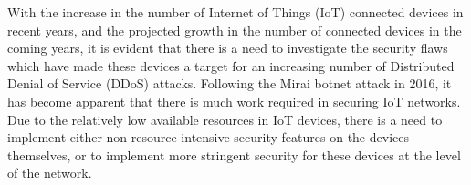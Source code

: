 With the increase in the number of Internet of Things (IoT) connected devices
in recent years, and the projected growth in the number of connected devices in
the coming years, it is evident that there is a need to investigate the
security flaws which have made these devices a target for an increasing number
of Distributed Denial of
Service (DDoS) attacks. Following the Mirai botnet attack in 2016, it has become
apparent that there is much work required in securing IoT networks. Due to the
relatively low available resources in IoT devices, there is a need to implement
either non-resource intensive security features on the devices themselves, or to
implement more stringent security for these devices at the level of the network.
